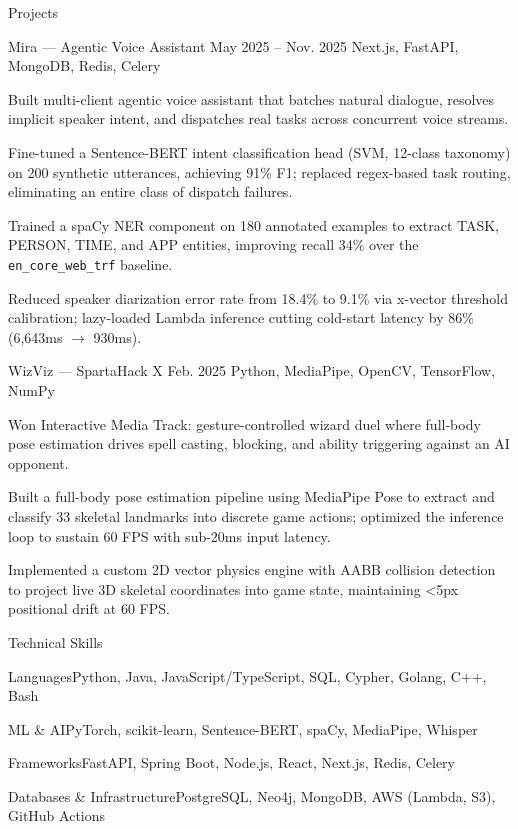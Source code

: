 \documentclass[
	11pt
]{../resume}
\begin{document}
	\begin{rSection}{P}{rojects}
		\begin{rSectionEntry}
			{Mira --- Agentic Voice Assistant}
			{May 2025 -- Nov. 2025}
			{}
			{Next.js, FastAPI, MongoDB, Redis, Celery}
			{}

			\item Built multi-client agentic voice assistant that batches natural dialogue, resolves implicit speaker intent, and dispatches real tasks across concurrent voice streams.
			\item Fine-tuned a Sentence-BERT intent classification head (SVM, 12-class taxonomy) on 200 synthetic utterances, achieving 91\% F1; replaced regex-based task routing, eliminating an entire class of dispatch failures.
			\item Trained a spaCy NER component on 180 annotated examples to extract TASK, PERSON, TIME, and APP entities, improving recall 34\% over the \texttt{en\_core\_web\_trf} baseline.
			\item Reduced speaker diarization error rate from 18.4\% to 9.1\% via x-vector threshold calibration; lazy-loaded Lambda inference cutting cold-start latency by 86\% (6{,}643ms $\rightarrow$ 930ms).
		\end{rSectionEntry}

		\begin{rSectionEntry}
			{WizViz --- SpartaHack X}
			{Feb. 2025}
			{}
			{Python, MediaPipe, OpenCV, TensorFlow, NumPy}
			{}

			\item Won Interactive Media Track: gesture-controlled wizard duel where full-body pose estimation drives spell casting, blocking, and ability triggering against an AI opponent.
			\item Built a full-body pose estimation pipeline using MediaPipe Pose to extract and classify 33 skeletal landmarks into discrete game actions; optimized the inference loop to sustain 60 FPS with sub-20ms input latency.
			\item Implemented a custom 2D vector physics engine with AABB collision detection to project live 3D skeletal coordinates into game state, maintaining \textless5px positional drift at 60 FPS.
		\end{rSectionEntry}
	\end{rSection}

	\begin{rSection}{T}{echnical Skills}
		\begin{rSet}{Languages}{Python, Java, JavaScript/TypeScript, SQL, Cypher, Golang, C++, Bash}
		\end{rSet}
		\begin{rSet}{ML \& AI}{PyTorch, scikit-learn, Sentence-BERT, spaCy, MediaPipe, Whisper}
		\end{rSet}
		\begin{rSet}{Frameworks}{FastAPI, Spring Boot, Node.js, React, Next.js, Redis, Celery}
		\end{rSet}
		\begin{rSet}{Databases \& Infrastructure}{PostgreSQL, Neo4j, MongoDB, AWS (Lambda, S3), GitHub Actions}
		\end{rSet}
	\end{rSection}
\end{document}
